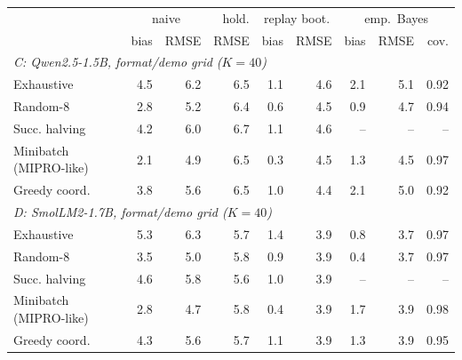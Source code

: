 \begin{tabular}{lrrrrrrrr}\toprule
\multicolumn{1}{l}{} & \multicolumn{2}{c}{naive} & hold. & \multicolumn{2}{c}{replay boot.} & \multicolumn{3}{c}{emp.\ Bayes} \\
 & bias & RMSE & RMSE & bias & RMSE & bias & RMSE & cov. \\\midrule
\multicolumn{9}{l}{\emph{C: Qwen2.5-1.5B, format/demo grid ($K{=}40$)}} \\
Exhaustive & 4.5 & 6.2 & 6.5 & 1.1 & 4.6 & 2.1 & 5.1 & 0.92 \\
Random-8 & 2.8 & 5.2 & 6.4 & 0.6 & 4.5 & 0.9 & 4.7 & 0.94 \\
Succ. halving & 4.2 & 6.0 & 6.7 & 1.1 & 4.6 & -- & -- & -- \\
Minibatch (MIPRO-like) & 2.1 & 4.9 & 6.5 & 0.3 & 4.5 & 1.3 & 4.5 & 0.97 \\
Greedy coord. & 3.8 & 5.6 & 6.5 & 1.0 & 4.4 & 2.1 & 5.0 & 0.92 \\
\multicolumn{9}{l}{\emph{D: SmolLM2-1.7B, format/demo grid ($K{=}40$)}} \\
Exhaustive & 5.3 & 6.3 & 5.7 & 1.4 & 3.9 & 0.8 & 3.7 & 0.97 \\
Random-8 & 3.5 & 5.0 & 5.8 & 0.9 & 3.9 & 0.4 & 3.7 & 0.97 \\
Succ. halving & 4.6 & 5.8 & 5.6 & 1.0 & 3.9 & -- & -- & -- \\
Minibatch (MIPRO-like) & 2.8 & 4.7 & 5.8 & 0.4 & 3.9 & 1.7 & 3.9 & 0.98 \\
Greedy coord. & 4.3 & 5.6 & 5.7 & 1.1 & 3.9 & 1.3 & 3.9 & 0.95 \\
\bottomrule
\end{tabular}

